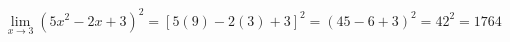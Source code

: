 \begin{ex}
\begin{align}
&\lim_{x\rightarrow 3} (5x^2-2x+3)^2 = [5(9)-2(3)+3]^2 = (45-6+3)^2 = 42^2 = 1764\nonumber
\end{align}
\end{ex}
